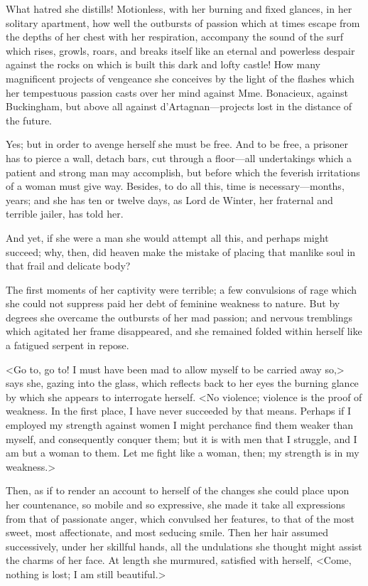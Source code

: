 What hatred she distills! Motionless, with her burning and fixed glances, in her solitary apartment, how well the outbursts of passion which at times escape from the depths of her chest with her respiration, accompany the sound of the surf which rises, growls, roars, and breaks itself like an eternal and powerless despair against the rocks on which is built this dark and lofty castle! How many magnificent projects of vengeance she conceives by the light of the flashes which her tempestuous passion casts over her mind against Mme. Bonacieux, against Buckingham, but above all against d'Artagnan---projects lost in the distance of the future. 

Yes; but in order to avenge herself she must be free. And to be free, a prisoner has to pierce a wall, detach bars, cut through a floor---all undertakings which a patient and strong man may accomplish, but before which the feverish irritations of a woman must give way. Besides, to do all this, time is necessary---months, years; and she has ten or twelve days, as Lord de Winter, her fraternal and terrible jailer, has told her. 

And yet, if she were a man she would attempt all this, and perhaps might succeed; why, then, did heaven make the mistake of placing that manlike soul in that frail and delicate body? 

The first moments of her captivity were terrible; a few convulsions of rage which she could not suppress paid her debt of feminine weakness to nature. But by degrees she overcame the outbursts of her mad passion; and nervous tremblings which agitated her frame disappeared, and she remained folded within herself like a fatigued serpent in repose. 

<Go to, go to! I must have been mad to allow myself to be carried away so,> says she, gazing into the glass, which reflects back to her eyes the burning glance by which she appears to interrogate herself. <No violence; violence is the proof of weakness. In the first place, I have never succeeded by that means. Perhaps if I employed my strength against women I might perchance find them weaker than myself, and consequently conquer them; but it is with men that I struggle, and I am but a woman to them. Let me fight like a woman, then; my strength is in my weakness.> 

Then, as if to render an account to herself of the changes she could place upon her countenance, so mobile and so expressive, she made it take all expressions from that of passionate anger, which convulsed her features, to that of the most sweet, most affectionate, and most seducing smile. Then her hair assumed successively, under her skillful hands, all the undulations she thought might assist the charms of her face. At length she murmured, satisfied with herself, <Come, nothing is lost; I am still beautiful.> 

